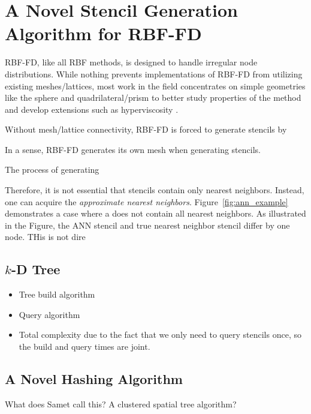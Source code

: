 \documentclass{report}
\begin{document}
\fi




\chapter{A Novel Stencil Generation Algorithm for RBF-FD}
\label{chap:stencils}

RBF-FD, like all RBF methods, is designed to handle irregular node distributions. While nothing prevents implementations of RBF-FD from utilizing existing meshes/lattices, most work in the field concentrates on simple geometries like the sphere \cite{FlyerWright07,FlyerLehto10,FlyerLehto11,FlyerWright09} and quadrilateral/prism \cite{FiNDTHESE} to better study properties of the method and develop extensions such as hyperviscosity \cite{FornbergLehto11}. 

Without mesh/lattice connectivity, RBF-FD is forced to generate stencils by 


In a sense, RBF-FD generates its own mesh when generating stencils. 

The process of generating 


Therefore, it is not essential that stencils contain only nearest neighbors. Instead, one can acquire the \emph{approximate nearest neighbors}. Figure~\ref{fig:ann_example} demonstrates a case where a does not contain all nearest neighbors. As illustrated in the Figure, the ANN stencil and true nearest neighbor stencil differ by one node. THis is not dire


\section{$k$-D Tree}
\begin{itemize} 
\item Tree build algorithm
\item Query algorithm
\item Total complexity due to the fact that we only need to query stencils once, so the build and query times are joint. 
\end{itemize}


\section{A Novel Hashing Algorithm}

What does Samet call this? A clustered spatial tree algorithm? 
\end{document}
